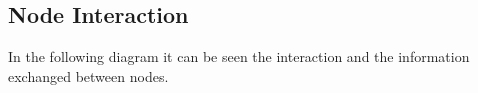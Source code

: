 
\subsection{Node Interaction}
In the following diagram it can be seen the interaction and the information exchanged between nodes.

